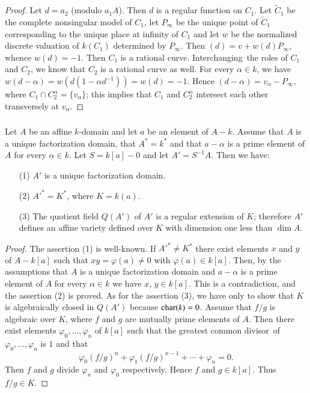 \begin{proof}
Let $d=a_{2}$ (modulo $a_{1}A$). Then $d$ is a regular function on
$C_{1}$. Let $\widetilde{C}_{1}$ be the complete nonsingular model of
$C_{1}$, let $P_{\infty}$ be the unique point of $\widetilde{C}_{1}$
corresponding to the unique place at infinity of $C_{1}$ and let $w$
be the normalized discrete valuation of $k(C_{1})$ determined by
$P_{\infty}$. Then $(d)=v+w(d)P_{\infty}$, whence $w(d)=-1$. Then
$C_{1}$ is a rational curve. Interchanging\pageoriginale\ the roles of
$C_{1}$ and $C_{2}$, we know that $C_{2}$ is a rational curve as
well. For every $\alpha\in k$, we have $w(d-\alpha)=w(d(1-\alpha
d^{-1}))=w(d)=-1$. Hence $(d-\alpha)=v_{\alpha}-P_{\infty}$, where
$C_{1}\cap C^{\alpha}_{2}=\{v_{\alpha}\}$; this implies that $C_{1}$
and $C^{\alpha}_{2}$ intersect each other transversely at
$v_{\alpha}$.
\end{proof}


\subsubsection{}\label{chap1:3.2.2}
\begin{lemma*}
  Let $A$ be an affine $k$-domain and let $a$ be an element of
  $A-k$. Assume that $A$ is a unique factorization domain, that
  $A^{\ast}=k^{\ast}$ and that $a-\alpha$ is a prime element of $A$ for
  every $\alpha\in k$. Let $S=k[a]-0$ and let $A'=S^{-1}A$. Then we
  have:
  \begin{itemize}
  \item[\rm(1)] $A'$ is a unique factorization domain.
    
  \item[\rm(2)] ${A'}^{\ast}=K^{\ast}$, where $K=k(a)$.
    
  \item[\rm(3)] The quotient field $Q(A')$ of $A'$ is a regular
    extension of $K$; therefore $A'$ defines an affine variety defined
    over $K$ with dimension one less than $\dim A$.
  \end{itemize}
\end{lemma*}

\begin{proof}
The assertion (1) is well-known. If ${A'}^{\ast}\neq K^{\ast}$ there
exist elements $x$ and $y$ of $A-k[a]$ such that $xy=\varphi(a)\neq 0$
with $\varphi(a)\in k[a]$. Then, by the assumptions that $A$ is a
unique factorization domain and $a-\alpha$ is a prime element of $A$
for every $\alpha\in k$ we have $x$, $y\in k[a]$. This is a
contradiction, and the assertion (2) is proved. As for the assertion
(3), we have only to show that $K$ is algebraically closed in $Q(A')$
because $\operatorname{char}(k)=0$. Assume that $f/g$ is algebraic over $K$, where
$f$ and $g$ are mutually prime elements of $A$. Then there exist
elements $\varphi_{0},\ldots,\varphi_{n}$ of $k[a]$ such that the
greatest common divisor\pageoriginale\ of
$\varphi_{0},\ldots,\varphi_{n}$ is $1$ and that 
$$
\varphi_{0}(f/g)^{n}+\varphi_{1}(f/g)^{n-1}+\cdots+\varphi_{n}=0.
$$
Then $f$ and $g$ divide $\varphi_{n}$ and $\varphi_{0}$
respectively. Hence $f$ and $g\in k[a]$. Thus $f/g\in K$.
\end{proof}

